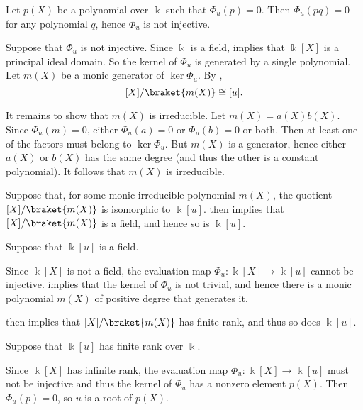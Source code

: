 \begin{defproof}
   Let \( p(X) \) be a polynomial over \( \Bbbk \) such that \( \Phi_u(p) = 0 \). Then \( \Phi_u(pq) = 0 \) for any polynomial \( q \), hence \( \Phi_u \) is not injective.

   Suppose that \( \Phi_u \) is not injective. Since \( \Bbbk \) is a field,  implies that \( \Bbbk[X] \) is a principal ideal domain. So the kernel of \( \Phi_u \) is generated by a single polynomial. Let \( m(X) \) be a monic generator of \( \ker \Phi_u \). By ,
  \begin{equation*}
    \Bbbk[X] / \braket{ m(X) } \cong \Bbbk[u].
  \end{equation*}

  It remains to show that \( m(X) \) is irreducible. Let \( m(X) = a(X) b(X) \). Since \( \Phi_u(m) = 0 \), either \( \Phi_u(a) = 0 \) or \( \Phi_u(b) = 0 \) or both. Then at least one of the factors must belong to \( \ker \Phi_u \). But \( m(X) \) is a generator, hence either \( a(X) \) or \( b(X) \) has the same degree (and thus the other is a constant polynomial). It follows that \( m(X) \) is irreducible.

   Suppose that, for some monic irreducible polynomial \( m(X) \), the quotient \( \Bbbk[X] / \braket{ m(X) } \) is isomorphic to \( \Bbbk[u] \).  then implies that \( \Bbbk[X] / \braket{ m(X) } \) is a field, and hence so is \( \Bbbk[u] \).

   Suppose that \( \Bbbk[u] \) is a field.

  Since \( \Bbbk[X] \) is not a field, the evaluation map \( \Phi_u: \Bbbk[X] \to \Bbbk[u] \) cannot be injective.  implies that the kernel of \( \Phi_u \) is not trivial, and hence there is a monic polynomial \( m(X) \) of positive degree that generates it.

   then implies that \( \Bbbk[X] / \braket{ m(X) } \) has finite rank, and thus so does \( \Bbbk[u] \).

   Suppose that \( \Bbbk[u] \) has finite rank over \( \Bbbk \).

  Since \( \Bbbk[X] \) has infinite rank, the evaluation map \( \Phi_u: \Bbbk[X] \to \Bbbk[u] \) must not be injective and thus the kernel of \( \Phi_u \) has a nonzero element \( p(X) \). Then \( \Phi_u(p) = 0 \), so \( u \) is a root of \( p(X) \).
\end{defproof}

